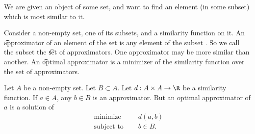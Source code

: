 

We are given an object of some set, and want to find an element (in some subset) which is most similar to it.


Consider a non-empty set, one of its subsets, and a similarity function on it.
An \t{approximator} of an element of the set is any element of the subset .
So we call the subset the \t{set of approximators}.
One approximator may be more similar than another.
An \t{optimal approximator} is a minimizer of the similarity function over the set of approximators.


Let $A$ be a non-empty set.
Let $B \subset A$.
Let $d: A \times A \to \R$ be a similarity function.
If $a \in A$, any $b \in B$ is an approximator.
But an optimal approximator of $a$ is a solution of
$$
\begin{aligned}
  \text{ minimize }   & \quad d(a, b) \\
  \text{ subject to } & \quad b \in B.
\end{aligned}
$$
